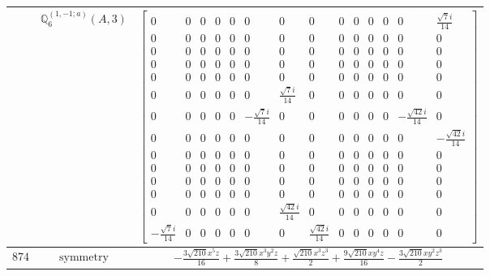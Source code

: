 \documentclass[fleqn,8pt,landscape]{jsarticle}
\begin{document}
\begin{longtable}{ccc}
$  $ & $ \mathbb{Q}_{6}^{(1,-1;a)}(A,3) $ & $ \begin{bmatrix} 0 & 0 & 0 & 0 & 0 & 0 & 0 & 0 & 0 & 0 & 0 & 0 & 0 & \frac{\sqrt{7} i}{14} \\ 0 & 0 & 0 & 0 & 0 & 0 & 0 & 0 & 0 & 0 & 0 & 0 & 0 & 0 \\ 0 & 0 & 0 & 0 & 0 & 0 & 0 & 0 & 0 & 0 & 0 & 0 & 0 & 0 \\ 0 & 0 & 0 & 0 & 0 & 0 & 0 & 0 & 0 & 0 & 0 & 0 & 0 & 0 \\ 0 & 0 & 0 & 0 & 0 & 0 & 0 & 0 & 0 & 0 & 0 & 0 & 0 & 0 \\ 0 & 0 & 0 & 0 & 0 & 0 & \frac{\sqrt{7} i}{14} & 0 & 0 & 0 & 0 & 0 & 0 & 0 \\ 0 & 0 & 0 & 0 & 0 & - \frac{\sqrt{7} i}{14} & 0 & 0 & 0 & 0 & 0 & 0 & - \frac{\sqrt{42} i}{14} & 0 \\ 0 & 0 & 0 & 0 & 0 & 0 & 0 & 0 & 0 & 0 & 0 & 0 & 0 & - \frac{\sqrt{42} i}{14} \\ 0 & 0 & 0 & 0 & 0 & 0 & 0 & 0 & 0 & 0 & 0 & 0 & 0 & 0 \\ 0 & 0 & 0 & 0 & 0 & 0 & 0 & 0 & 0 & 0 & 0 & 0 & 0 & 0 \\ 0 & 0 & 0 & 0 & 0 & 0 & 0 & 0 & 0 & 0 & 0 & 0 & 0 & 0 \\ 0 & 0 & 0 & 0 & 0 & 0 & 0 & 0 & 0 & 0 & 0 & 0 & 0 & 0 \\ 0 & 0 & 0 & 0 & 0 & 0 & \frac{\sqrt{42} i}{14} & 0 & 0 & 0 & 0 & 0 & 0 & 0 \\ - \frac{\sqrt{7} i}{14} & 0 & 0 & 0 & 0 & 0 & 0 & \frac{\sqrt{42} i}{14} & 0 & 0 & 0 & 0 & 0 & 0 \end{bmatrix} $ \\ \hline
$ 874 $ & $ \text{symmetry} $ & $ - \frac{3 \sqrt{210} x^{5} z}{16} + \frac{3 \sqrt{210} x^{3} y^{2} z}{8} + \frac{\sqrt{210} x^{3} z^{3}}{2} + \frac{9 \sqrt{210} x y^{4} z}{16} - \frac{3 \sqrt{210} x y^{2} z^{3}}{2} $ \\

\end{longtable}
\end{document}
